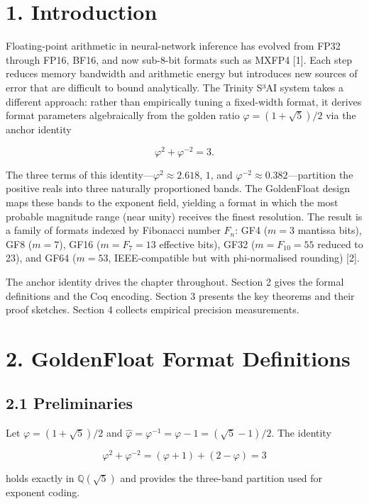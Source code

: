 \section{1. Introduction}\label{fa_06:introduction}

Floating-point arithmetic in neural-network
inference has evolved from FP32 through FP16,
BF16, and now sub-8-bit formats such as MXFP4
[1]. Each step reduces memory bandwidth and
arithmetic energy but introduces new sources of
error that are difficult to bound analytically.
The Trinity S³AI system takes a different
approach: rather than empirically tuning a
fixed-width format, it derives format parameters
algebraically from the golden ratio
\(\varphi = (1+\sqrt{5})/2\) via the anchor
identity

\[\varphi^2 + \varphi^{-2} = 3.\]

The three terms of this
identity---\(\varphi^2 \approx 2.618\), \(1\), and
\(\varphi^{-2} \approx 0.382\)---partition the
positive reals into three naturally proportioned
bands. The GoldenFloat design maps these bands to
the exponent field, yielding a format in which the
most probable magnitude range (near unity)
receives the finest resolution. The result is a
family of formats indexed by Fibonacci number
\(F_n\): GF4 (\(m=3\) mantissa bits), GF8
(\(m=7\)), GF16 (\(m=F_7=13\) effective bits),
GF32 (\(m=F_{10}=55\) reduced to 23), and GF64
(\(m=53\), IEEE-compatible but with phi-normalised
rounding) [2].

The anchor identity drives the chapter throughout.
Section 2 gives the formal definitions and the Coq
encoding. Section 3 presents the key theorems and
their proof sketches. Section 4 collects empirical
precision measurements.

\section{2. GoldenFloat Format
Definitions}\label{fa_06:goldenfloat-format-definitions}

\subsection{2.1
Preliminaries}\label{fa_06:preliminaries}

Let \(\varphi = (1+\sqrt{5})/2\) and
\(\hat\varphi = \varphi^{-1} = \varphi - 1 = (\sqrt{5}-1)/2\).
The identity

\[\varphi^2 + \varphi^{-2} = (\varphi+1) + (2-\varphi) = 3\]

holds exactly in \(\mathbb{Q}(\sqrt{5})\) and
provides the three-band partition used for
exponent coding.


